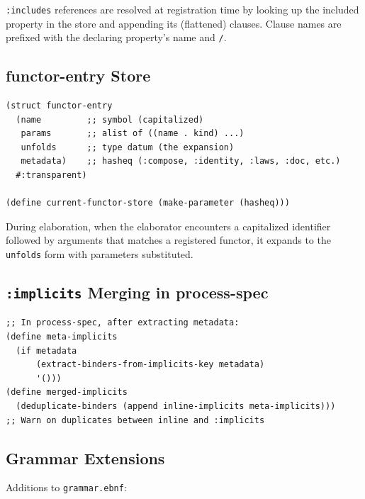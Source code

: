 \documentclass[11pt]{article}
\begin{document}
\texttt{:includes} references are resolved at registration time by looking up the
included property in the store and appending its (flattened) clauses. Clause
names are prefixed with the declaring property's name and \texttt{/}.
\subsection{functor-entry Store}
\label{sec:orgc69b8df}

\begin{verbatim}
(struct functor-entry
  (name         ;; symbol (capitalized)
   params       ;; alist of ((name . kind) ...)
   unfolds      ;; type datum (the expansion)
   metadata)    ;; hasheq (:compose, :identity, :laws, :doc, etc.)
  #:transparent)

(define current-functor-store (make-parameter (hasheq)))
\end{verbatim}

During elaboration, when the elaborator encounters a capitalized identifier
followed by arguments that matches a registered functor, it expands to the
\texttt{unfolds} form with parameters substituted.
\subsection{\texttt{:implicits} Merging in process-spec}
\label{sec:orgdc7080a}

\begin{verbatim}
;; In process-spec, after extracting metadata:
(define meta-implicits
  (if metadata
      (extract-binders-from-implicits-key metadata)
      '()))
(define merged-implicits
  (deduplicate-binders (append inline-implicits meta-implicits)))
;; Warn on duplicates between inline and :implicits
\end{verbatim}
\subsection{Grammar Extensions}
\label{sec:org93369ee}

Additions to \texttt{grammar.ebnf}:
\end{document}

